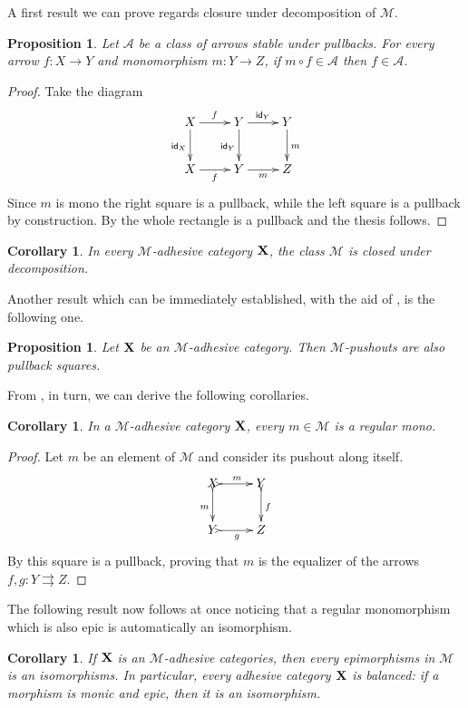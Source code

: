 \documentclass[a4paper]{article}
\newcommand{\id}[1]{\mathsf{id}_{#1}}
\def\X{\textbf {\textup{X}}}
\def\Y{\textbf {\textup{Y}}}
\newtheorem{proposition}[theorem]{Proposition}
\newtheorem{corollary}[theorem]{Corollary}
\theoremstyle{definition}
\begin{document}
A first result we can prove regards closure under decomposition of $\mathcal{M}$.

\begin{proposition}\label{prop:deco}Let  $\mathcal{A}$ be a class of arrows stable under pullbacks. For every arrow $f\colon X\to Y$ and monomorphism $m\colon Y\to Z$, if $m\circ f \in\mathcal{A}$ then $f\in \mathcal{A}$.
\end{proposition}
\begin{proof}Take the diagram
	\[\xymatrix{X \ar[d]_{\id{X}}\ar[r]^{f}& Y \ar[r]^{\id{Y}}  \ar[d]_{\id{Y}}& Y \ar[d]^{m}\\
		X \ar[r]_{f}& Y \ar[r]_{m} & Z}\]
	Since $m$ is mono the right square is a pullback, while the left square is a pullback by construction. By  the whole rectangle is a pullback and the thesis follows.
\end{proof}
\begin{corollary}\label{cor:deco}
	In every $\mathcal{M}$-adhesive category $\X$, the class $\mathcal{M}$ is closed under decomposition.
\end{corollary}

Another result which can be immediately established, with the aid of , is the following one.
\begin{proposition}\label{prop:pbpoad}
	Let $\X$ be an $\mathcal{M}$-adhesive category. Then $\mathcal{M}$-pushouts are also pullback squares.
\end{proposition}

From , in turn, we can derive the following corollaries.
\begin{corollary}\label{cor:rego}
	In a $\mathcal{M}$-adhesive category $\X$, every $m\in\mathcal{M}$ is a regular mono.
\end{corollary}
\begin{proof}
Let $m$ be an element of $\mathcal{M}$ and consider its pushout along itself.
\[\xymatrix{X\ar@{>->}[r]^m \ar@{>->}[d]_m& Y\ar@{>->}[d]^{f}\\Y \ar@{>->}[r]_g & Z}\]
By  this square is a pullback, proving that $m$ is the equalizer of the arrows $f,g\colon Y\rightrightarrows Z$. \qedhere 
\end{proof}

The following result now follows at once noticing that a regular monomorphism which is also epic is automatically an isomorphism.

\begin{corollary}\label{prop:bal}
If $\X$ is an $\mathcal{M}$-adhesive categories, then every epimorphisms in $\mathcal{M}$ is an isomorphisms. In particular, every adhesive category $\X$ is \emph{balanced}: if a morphism is monic and epic, then it is an isomorphism.
\end{corollary}
\end{document}
